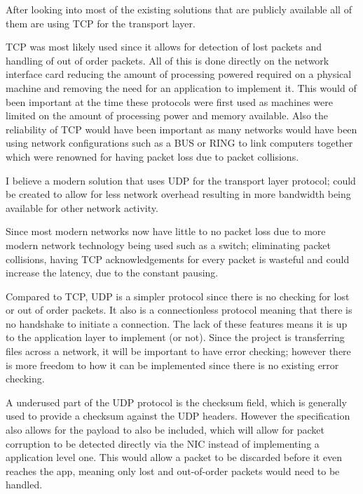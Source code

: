 After looking into most of the existing solutions that are publicly available all of them are using TCP for the transport layer.

TCP was most likely used since it allows for detection of lost packets and handling of out of order packets. All of this is done directly on the network interface card reducing the amount of processing powered required on a physical machine and removing the need for an application to implement it. This would of been important at the time these protocols were first used as machines were limited on the amount of processing power and memory available. Also the reliability of TCP would have been important as many networks would have been using network configurations such as a BUS or RING to link computers together which were renowned for having packet loss due to packet collisions.

I believe a modern solution that uses UDP for the transport layer protocol; could be created to allow for less network overhead resulting in more bandwidth being available for other network activity.

Since most modern networks now have little to no packet loss due to more modern network technology being used such as a switch; eliminating packet collisions, having TCP acknowledgements for every packet is wasteful and could increase the latency, due to the constant pausing.

Compared to TCP, UDP is a simpler protocol since there is no checking for lost or out of order packets. It also is a connectionless protocol meaning that there is no handshake to initiate a connection. The lack of these features means it is up to the application layer to implement (or not). Since the project is transferring files across a network, it will be important to have error checking; however there is more freedom to how it can be implemented since there is no existing error checking.

A underused part of the UDP protocol is the checksum field, which is generally used to provide a checksum against the UDP headers. However the specification also allows for the payload to also be included, which will allow for packet corruption to be detected directly via the NIC instead of implementing a application level one. This would allow a packet to be discarded before it even reaches the app, meaning only lost and out-of-order packets would need to be handled.
